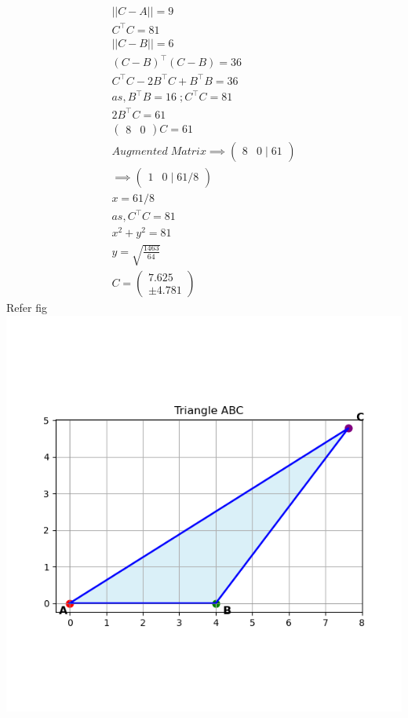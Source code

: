 \documentclass[journal]{IEEEtran}
\begin{document}
\begin{align}
    ||C-A||=9\\
    C^\top C=81\\
    ||C-B||=6\\
    (C-B)^\top (C-B)=36\\
    C^\top C-2 B^\top C +B^\top B=36\\
    as,B^\top B =16 \; ; C^\top C=81\\
    2B^\top C =61\\
    \begin{pmatrix}
        8 & 0
    \end{pmatrix}C=61\\
    Augmented\;Matrix \implies
    \begin{pmatrix}
        8 & 0 \;| \;61
    \end{pmatrix}\\
    \implies
    \begin{pmatrix}
        1 & 0 \;|\; 61/8
    \end{pmatrix}\\
    x=61/8\\
    as,C^\top C =81\\
    x^2+y^2=81\\
    y=\sqrt{\frac{1463}{64}}\\
    C=\begin{pmatrix}
        7.625\\ \pm4.781
    \end{pmatrix}
\end{align}
Refer fig
\centering
    \includegraphics[width=\columnwidth, height=0.8\textheight, keepaspectratio]{figs/Figure_5.png}     
\end{document}
